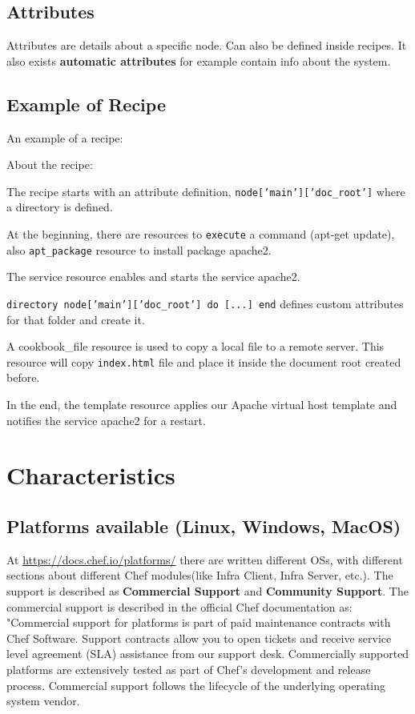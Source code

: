 \documentclass[12pt,a4paper,openright,twoside]{book}
\begin{document}
\subsection{Attributes}
Attributes are details about a specific node. Can also be defined inside recipes.
It also exists \textbf{automatic attributes} for example contain info about the system.


\subsection{Example of Recipe}
An example of a recipe\cite{chefDigitalOcean}:



About the recipe:

The recipe starts with an attribute definition, \texttt{node['main']['doc\_root']} where a directory is defined.


At the beginning, there are resources to \texttt{execute} a command (apt-get update), also \texttt{apt\_package} resource to install package apache2.


The service resource enables and starts the service apache2.

\texttt
{directory node['main']['doc\_root'] do [...] end} defines custom attributes for that folder and create it.

A cookbook\_file resource is used to copy a local file to a remote server. This resource will copy \texttt{index.html} file and place it inside the document root created before.


In the end, the template resource applies our Apache virtual host template and notifies the service apache2 for a restart.

\section{Characteristics}

\subsection{Platforms available (Linux, Windows, MacOS)}
At \url{https://docs.chef.io/platforms/} there are written different OSs, with different sections about different Chef modules(like Infra Client, Infra Server, etc.).
The support is described as \textbf{Commercial Support} and \textbf{Community Support}.
The commercial support is described in the official Chef documentation as:
"Commercial support for platforms is part of paid maintenance contracts with Chef Software. Support contracts allow you to open tickets and receive service level agreement (SLA) assistance from our support desk. Commercially supported platforms are extensively tested as part of Chef’s development and release process. Commercial support follows the lifecycle of the underlying operating system vendor.
\end{document}
